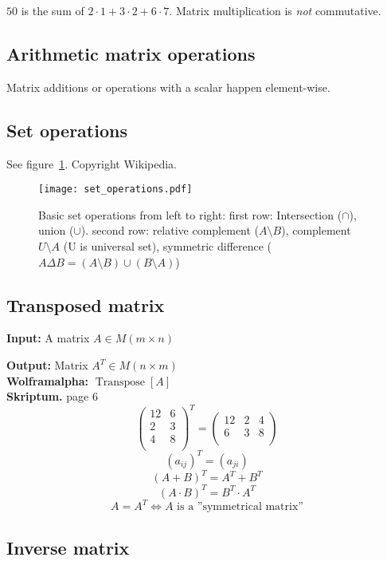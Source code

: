 \documentclass[a4paper,twocolumn]{article}
\newcommand{\io}[2]{{\par\noindent\textbf{Input:} #1 \\}{\textbf{Output:} #2 \\}}
\newcommand{\wa}[1]{\textbf{Wolframalpha:} $#1$ \\}
\newcommand{\scriptref}[1]{\textbf{Skriptum.} page #1 \\}
\begin{document}
$50$ is the sum of $2\cdot1 + 3\cdot2 + 6\cdot7$.
Matrix multiplication is \emph{not} commutative.

\subsection{Arithmetic matrix operations}

Matrix additions or operations with a scalar happen element-wise.

\subsection{Set operations}

See figure~\ref{fig:set_operations}. Copyright Wikipedia.
%
\begin{figure}[h]
  \begin{center}
    \texttt{[image: set\_operations.pdf]}
    \caption{
        Basic set operations from left to right:
        first row: Intersection ($\cap$), union ($\cup$).
        second row: relative complement ($A \setminus B$),
            complement $U \setminus A$ (U is universal set),
            symmetric difference ($A \Delta B = (A\setminus B) \cup (B
            \setminus A)$)
    }
    \label{fig:set_operations}
  \end{center}
\end{figure}

\subsection{Transposed matrix}

\io{A matrix $A \in M(m\times n)$}{Matrix $A^T \in M(n\times m)$}
\wa{\operatorname{Transpose}[A]}
\scriptref{6}
%
\[
    \begin{pmatrix}
        12 & 6 \\
        2  & 3 \\
        4  & 8 \\
    \end{pmatrix}^T
    =
    \begin{pmatrix}
        12 & 2 & 4 \\
        6 & 3 & 8 \\
    \end{pmatrix}
\] \[
    (a_{ij})^T = (a_{ji})
\] \[
    (A + B)^T = A^T + B^T
\] \[
    (A\cdot B)^T = B^T\cdot A^T
\] \[
    A = A^T \Leftrightarrow A\text{ is a ''symmetrical matrix''}
\]

\subsection{Inverse matrix}
\end{document}
